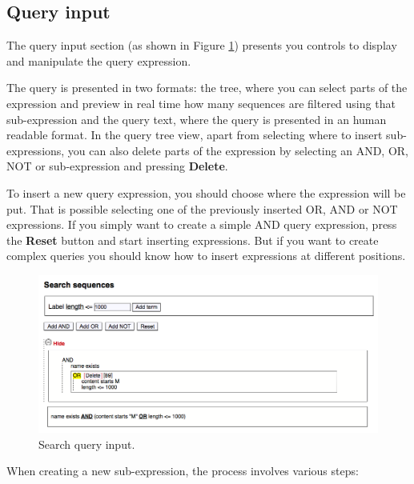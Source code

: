 \subsection{Query input}

The query input section (as shown in Figure \ref{fig:search1_man}) presents you controls
to display and manipulate the query expression.

The query is presented in two formats: the tree, where you can select parts of the expression
and preview in real time how many sequences are filtered using that sub-expression and the
query text, where the query is presented in an human readable format. In the query tree view,
apart from selecting where to insert sub-expressions, you can also delete parts of the expression by
selecting an AND, OR, NOT or sub-expression and pressing \textbf{Delete}.

To insert a new query expression, you should choose where the expression will be put. That is possible
selecting one of the previously inserted OR, AND or NOT expressions. If you simply want
to create a simple AND query expression, press the \textbf{Reset} button and start
inserting expressions. But if you want to create complex queries you should know how to
insert expressions at different positions.

\begin{figure}[H]
  \centering
    \includegraphics[scale=0.5]{search1.png}
  \caption{Search query input.}
  \label{fig:search1_man}
\end{figure}

When creating a new sub-expression, the process involves various steps:

